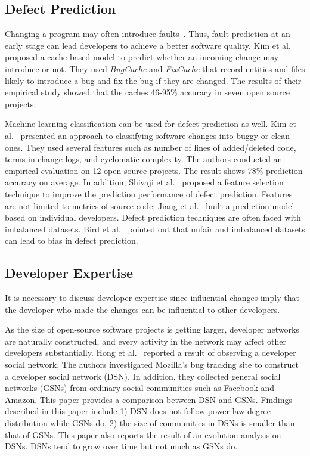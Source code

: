 \subsection{Defect Prediction}

Changing a program may often introduce
faults~\cite{sliwerski_hatari:_2005,kim_automatic_2006}.
Thus, fault prediction at an early stage can lead developers to achieve
a better software quality. Kim et al.~\cite{kim_predicting_2007} proposed a
cache-based model to predict whether an incoming change may introduce or not.
They used \emph{BugCache} and \emph{FixCache} that record entities and files
likely to introduce a bug and fix the bug if they are changed. The results of
their empirical study showed that the caches 46-95\% accuracy in seven open
source projects.

Machine learning classification can be used for defect prediction as well. Kim
et al.~\cite{kim_classifying_2008} presented an approach to classifying
software changes into buggy or clean ones. They used several features such as number of
lines of added/deleted code, terms in change logs, and cyclomatic complexity.
The authors conducted an empirical evaluation on 12 open source projects. The
result shows 78\% prediction accuracy on average. In addition, Shivaji et
al.~\cite{shivaji_reducing_2009} proposed a feature selection technique to
improve the prediction performance of defect prediction. Features are not
limited to metrics of source code; Jiang et al.~\cite{jiang_personalized_2013}
built a prediction model based on individual developers. Defect prediction
techniques are often faced with imbalanced datasets. Bird et
al.~\cite{bird_fair_2009} pointed out that unfair and imbalanced datasets can
lead to bias in defect prediction.


\subsection{Developer Expertise}

It is necessary to discuss developer expertise since influential changes imply
that the developer who made the changes can be influential to other developers.

As the size of open-source software projects is getting larger, developer
networks are naturally constructed, and every activity in the network may affect
other developers substantially. Hong et al.~\cite{hong_understanding_2011}
reported a result of observing a developer social network. The authors
investigated Mozilla's bug tracking site to construct a developer social network
(DSN). In addition, they collected general social networks (GSNs) from ordinary
social communities such as Facebook and Amazon. This paper provides a
comparison between DSN and GSNs. Findings described in this paper include 1) DSN
does not follow power-law degree distribution while GSNs do, 2) the size of
communities in DSNs is smaller than that of GSNs. This paper also reports the
result of an evolution analysis on DSNs. DSNs tend to grow over time but not much as
GSNs do.


